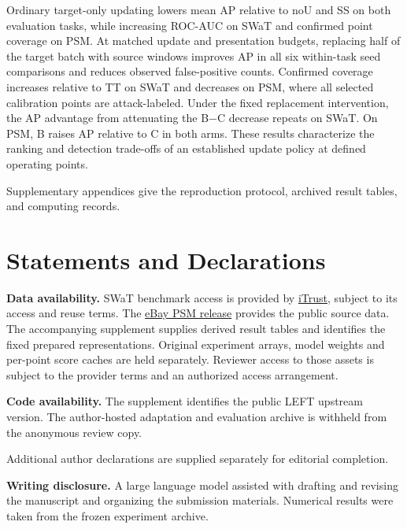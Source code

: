 \documentclass[pdflatex,sn-apa]{sn-jnl}
\begin{document}
Ordinary target-only updating lowers mean AP relative to noU and SS on
both evaluation tasks, while increasing ROC-AUC on SWaT and confirmed
point coverage on PSM. At matched update and presentation budgets,
replacing half of the target batch with source windows improves AP in
all six within-task seed comparisons and reduces observed false-positive
counts. Confirmed coverage increases relative to TT on SWaT and
decreases on PSM, where all selected calibration points are
attack-labeled. Under the fixed replacement intervention, the AP
advantage from attenuating the B\ensuremath{-}C decrease repeats on SWaT. On PSM, B
raises AP relative to C in both arms. These results characterize the
ranking and detection trade-offs of an established update policy at
defined operating points.

Supplementary appendices give the reproduction protocol, archived result
tables, and computing records.

\section*{Statements and
Declarations}\label{statements-and-declarations}

\textbf{Data availability.} SWaT benchmark access is provided by
\href{https://www.sutd.edu.sg/itrust/itrust-labs/datasets/dataset-characteristics/swat/}{iTrust},
subject to its access and reuse terms. The
\href{https://github.com/eBay/RANSynCoders/tree/main/data}{eBay PSM
release} provides the public source data. The accompanying supplement
supplies derived result tables and identifies the fixed prepared
representations. Original experiment arrays, model weights and per-point
score caches are held separately. Reviewer access to those assets is
subject to the provider terms and an authorized access arrangement.

\textbf{Code availability.} The supplement identifies the public LEFT
upstream version. The author-hosted adaptation and evaluation archive is
withheld from the anonymous review copy.

Additional author declarations are supplied separately for editorial completion.

\textbf{Writing disclosure.} A large language model assisted with drafting and revising the manuscript and organizing the submission materials. Numerical results were taken from the frozen experiment archive.

\backmatter

\end{document}
